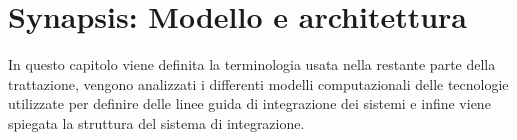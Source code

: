 \chapter{Synapsis: Modello e architettura}

In questo capitolo viene definita la terminologia usata nella restante parte della trattazione, vengono analizzati i differenti modelli computazionali delle tecnologie utilizzate per definire delle linee guida di integrazione dei sistemi e infine viene spiegata la struttura del sistema di integrazione.








